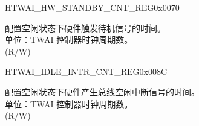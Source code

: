 \begin{register}{H}{TWAI\_HW\_STANDBY\_CNT\_REG}{0x0070}\label{regdesc:TWAIHWSTANDBYCNTREG}
%
\regnewline%
\begin{regdesc}\begin{reglist}
\label{fielddesc:TWAISTANDBYWAITCNT}\item [TWAI\_STANDBY\_WAIT\_CNT] 配置空闲状态下硬件触发待机信号的时间。\\
单位：TWAI 控制器时钟周期数。\\
(R/W)
\end{reglist}\end{regdesc}
\end{register}


\begin{register}{H}{TWAI\_IDLE\_INTR\_CNT\_REG}{0x008C}\label{regdesc:TWAIIDLEINTRCNTREG}
%
\regnewline%
\begin{regdesc}\begin{reglist}
\label{fielddesc:TWAIIDLEINTRCNT}\item [TWAI\_IDLE\_INTR\_CNT] 配置空闲状态下硬件产生总线空闲中断信号的时间。\\
单位：TWAI 控制器时钟周期数。\\
(R/W)
\end{reglist}\end{regdesc}
\end{register}


